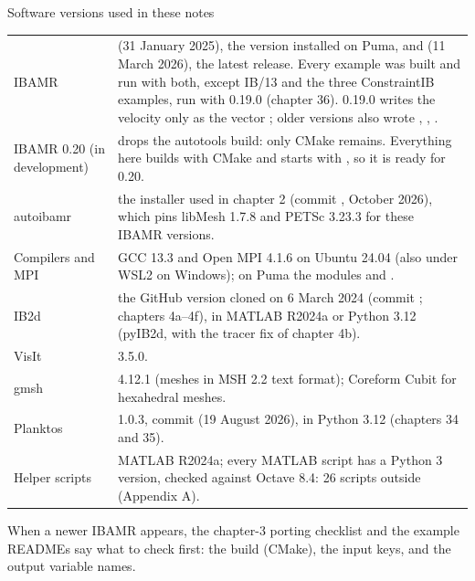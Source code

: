 \documentclass[aspectratio=169,11pt]{beamer}
\begin{document}
\begin{frame}{Software versions used in these notes}
\scriptsize
\begin{tabular}{@{}L{0.18\textwidth}L{0.76\textwidth}@{}}
\toprule
IBAMR &  (31 January 2025), the version installed on Puma, and  (11 March 2026), the latest release. Every example was built and run with both, except IB/13 and the three ConstraintIB examples, run with 0.19.0 (chapter 36). 0.19.0 writes the velocity only as the vector ; older versions also wrote , , .\\
IBAMR 0.20 (in development) & drops the autotools build: only CMake remains. Everything here builds with CMake and starts with , so it is ready for 0.20.\\
autoibamr & the installer used in chapter 2 (commit , October 2026), which pins libMesh 1.7.8 and PETSc 3.23.3 for these IBAMR versions.\\
Compilers and MPI & GCC 13.3 and Open MPI 4.1.6 on Ubuntu 24.04 (also under WSL2 on Windows); on Puma the modules  and .\\
IB2d & the GitHub version cloned on 6 March 2024 (commit ; chapters 4a--4f), in MATLAB R2024a or Python 3.12 (pyIB2d, with the tracer fix of chapter 4b).\\
VisIt & 3.5.0.\\
gmsh & 4.12.1 (meshes in MSH 2.2 text format); Coreform Cubit for hexahedral meshes.\\
Planktos & 1.0.3, commit  (19 August 2026), in Python 3.12 (chapters 34 and 35).\\
Helper scripts & MATLAB R2024a; every MATLAB script has a Python 3 version, checked against Octave 8.4: 26 scripts outside  (Appendix A).\\
\bottomrule
\end{tabular}
\vspace{2mm}
\begin{punchbox}
\small When a newer IBAMR appears, the chapter-3 porting checklist and the example READMEs say what to check first: the build (CMake), the input keys, and the output variable names.
\end{punchbox}
\end{frame}
\end{document}
